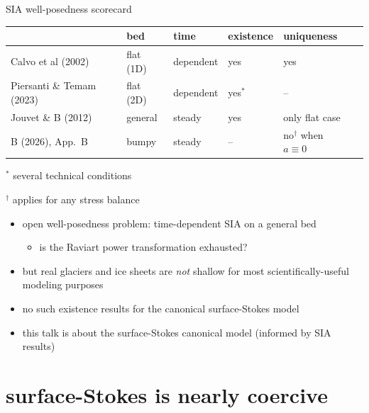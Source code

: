 \documentclass[aspectratio=169,10pt]{beamer}
\newcommand{\lc}{{\text{\large $\circ$}}}
\begin{document}
\begin{frame}{SIA well-posedness scorecard}

\begin{center}
\setlength{\tabcolsep}{5pt}
\begin{tabular}{llllll}
 & bed & time & existence & uniqueness \\
\midrule
Calvo et al (2002) & flat (1D) & dependent & yes & yes \\
Piersanti \& Temam (2023) & flat (2D) & dependent & yes$^*$ & -- \\
Jouvet \& B (2012) & general & steady & yes & only flat case \\
B (2026), App.~B & bumpy & steady & -- & \alert{no}$^\dagger$ when $a\equiv 0$ \\
\midrule
\end{tabular}
\end{center}

\vspace{-2mm}
{\hfill \footnotesize $^*$ several technical conditions}

{\hfill \footnotesize $^\dagger$ applies for any stress balance}

\smallskip
\begin{itemize}
\item open well-posedness problem: time-dependent SIA on a general bed
    \begin{itemize}
    \item[$\lc$] is the Raviart power transformation exhausted?
    \end{itemize}

\pause
\medskip
\item but real glaciers and ice sheets are \emph{not} shallow for most scientifically-useful modeling purposes
\item \alert{no such existence results} for the canonical surface-Stokes model
\item this talk is about the surface-Stokes canonical model (informed by SIA results)
\end{itemize}
\end{frame}


\section{surface-Stokes is nearly coercive}
\end{document}
